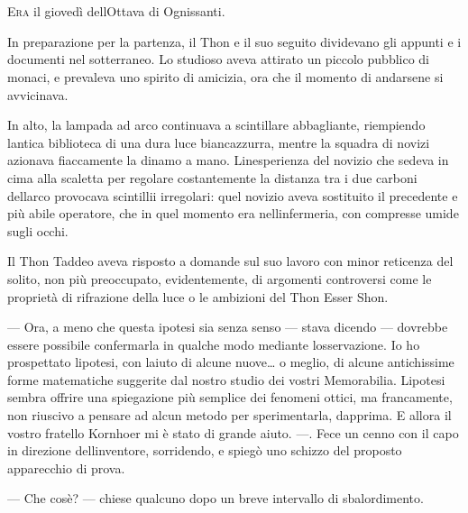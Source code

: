 	\chapter{\phantom{text}}

\lettrine[lhang=0.2]{E}{ra} il giovedì dell\textquotesingle Ottava di Ognissanti.

In preparazione per la partenza, il Thon e il suo seguito dividevano gli
appunti e i documenti nel sotterraneo. Lo studioso aveva attirato un
piccolo pubblico di monaci, e prevaleva uno spirito di amicizia, ora che
il momento di andarsene si avvicinava.

In alto, la lampada ad arco continuava a scintillare abbagliante,
riempiendo l\textquotesingle antica biblioteca di una dura luce
biancazzurra, mentre la squadra di novizi azionava fiaccamente la dinamo
a mano. L\textquotesingle inesperienza del novizio che sedeva in cima
alla scaletta per regolare costantemente la distanza tra i due carboni
dell\textquotesingle arco provocava scintillii irregolari: quel novizio
aveva sostituito il precedente e più abile operatore, che in quel
momento era nell\textquotesingle infermeria, con compresse umide sugli
occhi.

Il Thon Taddeo aveva risposto a domande sul suo lavoro con minor
reticenza del solito, non più preoccupato, evidentemente, di argomenti
controversi come le proprietà di rifrazione della luce o le ambizioni
del Thon Esser Shon.

--- Ora, a meno che questa ipotesi sia senza senso --- stava dicendo ---
dovrebbe essere possibile confermarla in qualche modo mediante
l\textquotesingle osservazione. Io ho prospettato
l\textquotesingle ipotesi, con l\textquotesingle aiuto di alcune
nuove\ldots{} o meglio, di alcune antichissime forme matematiche
suggerite dal nostro studio dei vostri Memorabilia.
L\textquotesingle ipotesi sembra offrire una spiegazione più semplice
dei fenomeni ottici, ma francamente, non riuscivo a pensare ad alcun
metodo per sperimentarla, dapprima. E allora il vostro fratello Kornhoer
mi è stato di grande aiuto. ---. Fece un cenno con il capo in direzione
dell\textquotesingle inventore, sorridendo, e spiegò uno schizzo del
proposto apparecchio di prova.

--- Che cos\textquotesingle è? --- chiese qualcuno dopo un breve
intervallo di sbalordimento.

